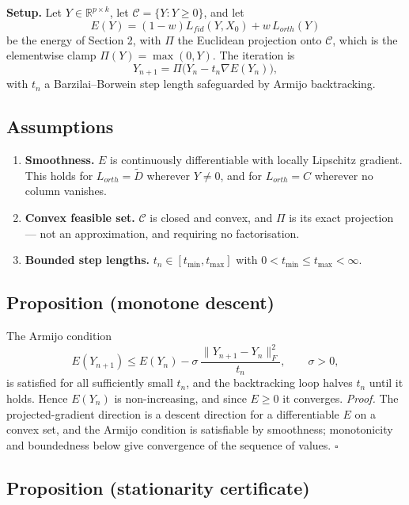 \documentclass[
]{article}
\begin{document}
\textbf{Setup.} Let \(Y \in \mathbb{R}^{p\times k}\), let \(\mathcal{C} = \{Y : Y \ge 0\}\), and let
\[
E(Y) = (1-w)L_{fid}(Y, X_0) + w\,L_{orth}(Y)
\]
be the energy of Section 2, with \(\Pi\) the Euclidean projection onto \(\mathcal{C}\), which is the elementwise clamp \(\Pi(Y) = \max(0,Y)\). The iteration is
\[
Y_{n+1} = \Pi\big(Y_n - t_n \nabla E(Y_n)\big),
\]
with \(t_n\) a Barzilai--Borwein step length safeguarded by Armijo backtracking.

\subsection{Assumptions}\label{assumptions}

\begin{enumerate}
\def\labelenumi{\arabic{enumi}.}
\item
  \textbf{Smoothness.} \(E\) is continuously differentiable with locally Lipschitz gradient. This holds for \(L_{orth} = \tilde D\) wherever \(Y \neq 0\), and for \(L_{orth} = C\) wherever no column vanishes.
\item
  \textbf{Convex feasible set.} \(\mathcal{C}\) is closed and convex, and \(\Pi\) is its exact projection --- not an approximation, and requiring no factorisation.
\item
  \textbf{Bounded step lengths.} \(t_n \in [t_{\min}, t_{\max}]\) with \(0 < t_{\min} \le t_{\max} < \infty\).
\end{enumerate}

\subsection{Proposition (monotone descent)}\label{proposition-monotone-descent}

The Armijo condition
\[
E(Y_{n+1}) \le E(Y_n) - \sigma\,\frac{\|Y_{n+1} - Y_n\|_F^2}{t_n},\qquad \sigma > 0,
\]
is satisfied for all sufficiently small \(t_n\), and the backtracking loop halves \(t_n\) until it holds. Hence \(E(Y_n)\) is non-increasing, and since \(E \ge 0\) it converges. \emph{Proof.} The projected-gradient direction is a descent direction for a differentiable \(E\) on a convex set, and the Armijo condition is satisfiable by smoothness; monotonicity and boundedness below give convergence of the sequence of values. \(\square\)

\subsection{Proposition (stationarity certificate)}\label{proposition-stationarity-certificate}
\end{document}
